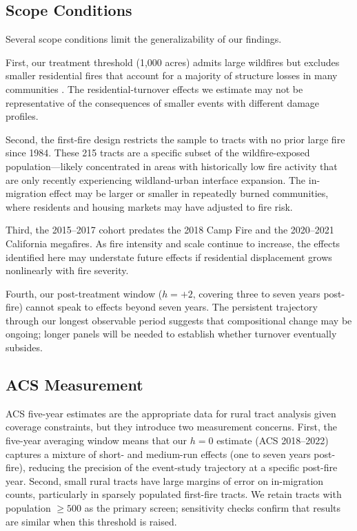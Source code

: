 \documentclass[12pt]{article}
\begin{document}
\subsection{Scope Conditions}

Several scope conditions limit the generalizability of our findings.

First, our treatment threshold (1,000 acres) admits large wildfires but
excludes smaller residential fires that account for a majority of
structure losses in many communities \citep{mcconnell2024wildfire}.
The residential-turnover effects we estimate may not be representative
of the consequences of smaller events with different damage profiles.

Second, the first-fire design restricts the sample to tracts with no
prior large fire since 1984.
These 215 tracts are a specific subset of the wildfire-exposed
population---likely concentrated in areas with historically low
fire activity that are only recently experiencing wildland-urban
interface expansion.
The in-migration effect may be larger or smaller in repeatedly
burned communities, where residents and housing markets may have
adjusted to fire risk.

Third, the 2015--2017 cohort predates the
2018 Camp Fire and the 2020--2021 California megafires.
As fire intensity and scale continue to increase,
the effects identified here may understate future effects
if residential displacement grows nonlinearly with fire severity.

Fourth, our post-treatment window ($h = +2$, covering three to seven
years post-fire) cannot speak to effects beyond seven years.
The persistent trajectory through our longest observable period
suggests that compositional change may be ongoing; longer panels
will be needed to establish whether turnover eventually subsides.

\subsection{ACS Measurement}

ACS five-year estimates are the appropriate data for rural tract analysis
given coverage constraints, but they introduce two measurement concerns.
First, the five-year averaging window means that our $h = 0$ estimate
(ACS 2018--2022) captures a mixture of short- and medium-run effects
(one to seven years post-fire), reducing the precision of the
event-study trajectory at a specific post-fire year.
Second, small rural tracts have large margins of error on in-migration
counts, particularly in sparsely populated first-fire tracts.
We retain tracts with population $\geq 500$ as the primary screen;
sensitivity checks confirm that results are similar when this
threshold is raised.
\end{document}
